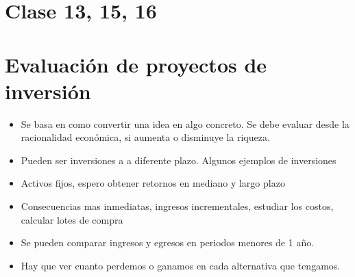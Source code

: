 \documentclass[titlepage,a4paper]{article}
\begin{document}







\newpage
\section*{Clase 13, 15, 16}
\section{Evaluación de proyectos de inversión}
\begin{itemize}
\item Se basa en como convertir una idea en algo concreto. Se debe evaluar desde la racionalidad económica, si aumenta o disminuye la riqueza.
\item Pueden ser inversiones a a diferente plazo. Algunos ejemplos de inversiones
\item Activos fijos, espero obtener retornos en mediano y largo plazo
\item Consecuencias mas inmediatas, ingresos incrementales, estudiar los costos, calcular lotes de compra
\item Se pueden comparar ingresos y egresos en periodos menores de 1 año.
\item Hay que ver cuanto perdemos o ganamos en cada alternativa que tengamos.
\end{itemize}
\end{document}
